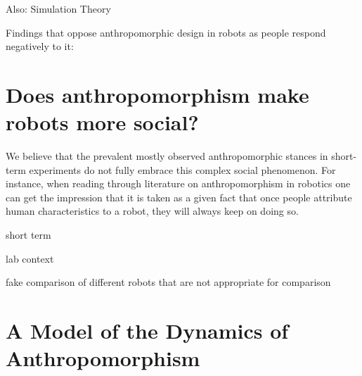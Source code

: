 \documentclass[lettersize, apacite, twoside, HRI]{apa_HRI}
\begin{document}
	Also: Simulation Theory

	Findings that oppose anthropomorphic design in robots as people respond negatively to it:
	
	
%
%
%
%
%
%

\section{Does anthropomorphism make robots more social?}
\label{sec:6}

We believe that the prevalent mostly observed anthropomorphic stances in short-term experiments do not fully embrace this complex social phenomenon. For instance, when reading through literature on anthropomorphism in robotics one can get the impression that it is taken as a given fact that once people attribute human characteristics to a robot, they will always keep on doing so.
	
	short term
	
	lab context
	
	fake comparison of different robots that are not appropriate for comparison	
	
	
%
%
%
%
%
%

\section{A Model of the Dynamics of Anthropomorphism}
\label{sec:dynamics_model}
\end{document}
